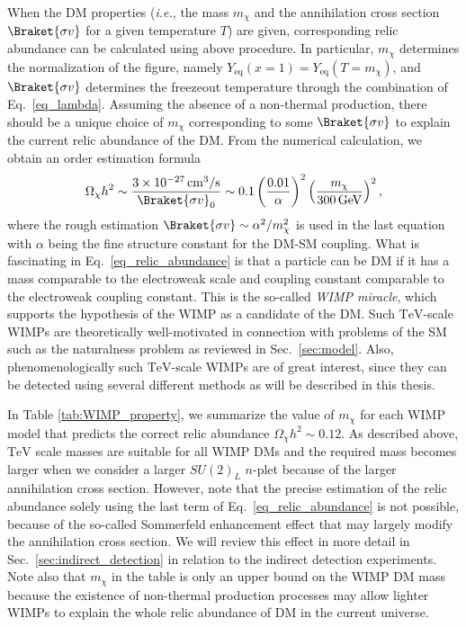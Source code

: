 \documentclass[12pt,twoside,book]{article}
\begin{document}
When the DM properties (\textit{i.e.}, the mass $m_\chi$ and the annihilation cross section $\Braket{\sigma v}$ for a given temperature $T$) are given, corresponding relic abundance can be calculated using above procedure.
In particular, $m_\chi$ determines the normalization of the figure, namely $Y_{\mathrm{eq}} (x=1) = Y_{\mathrm{eq}} (T=m_\chi)$, and $\Braket{\sigma v}$ determines the freezeout temperature through the combination of Eq.~\eqref{eq_lambda}.
Assuming the absence of a non-thermal production, there should be a unique choice of $m_\chi$ corresponding to some $\Braket{\sigma v}$ to explain the current relic abundance of the DM.
From the numerical calculation, we obtain an order estimation formula
\begin{align}
  \Omega_\chi h^2 \sim \frac{3 \times 10^{-27}\,\mathrm{cm^3}/\mathrm{s}}
  {\Braket{\sigma v}_0} \sim
  0.1 \left( \frac{0.01}{\alpha} \right)^2
  \left( \frac{m_\chi}{300\,\mathrm{GeV}} \right)^2,\label{eq_relic_abundance}
\end{align}
where the rough estimation $\Braket{\sigma v} \sim \alpha^2/m_\chi^2$ is used in the last equation with $\alpha$ being the fine structure constant for the DM-SM coupling.
What is fascinating in Eq.~\eqref{eq_relic_abundance} is that a particle can be DM if it has a mass comparable to the electroweak scale and coupling constant comparable to the electroweak coupling constant.
This is the so-called \textit{WIMP miracle}, which supports the hypothesis of the WIMP as a candidate of the DM.
Such $\mathrm{TeV}$-scale WIMPs are theoretically well-motivated in connection with problems of the SM such as the naturalness problem as reviewed in Sec.~\ref{sec:model}.
Also, phenomenologically such $\mathrm{TeV}$-scale WIMPs are of great interest, since they can be detected using several different methods as will be described in this thesis.

In Table \ref{tab:WIMP_property}, we summarize the value of $m_\chi$ for each WIMP model that predicts the correct relic abundance $\Omega_\chi h^2 \sim 0.12$.
As described above, $\mathrm{TeV}$ scale masses are suitable for all WIMP DMs and the required mass becomes larger when we consider a larger $SU(2)_L$ $n$-plet because of the larger annihilation cross section.
However, note that the precise estimation of the relic abundance solely using the last term of Eq.~\eqref{eq_relic_abundance} is not possible, because of the so-called Sommerfeld enhancement effect \cite{Hisano:2004ds,Hisano:2006nn} that may largely modify the annihilation cross section.
We will review this effect in more detail in Sec.~\ref{sec:indirect_detection} in relation to the indirect detection experiments.
Note also that $m_\chi$ in the table is only an upper bound on the WIMP DM mass because the existence of non-thermal production processes may allow lighter WIMPs to explain the whole relic abundance of DM in the current universe.
\end{document}
